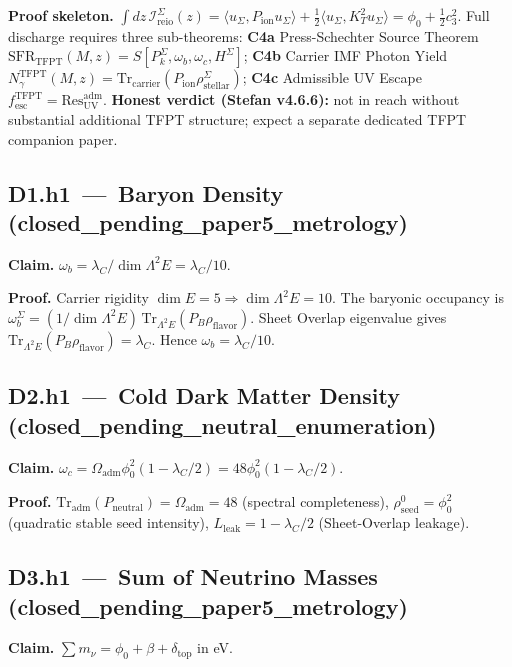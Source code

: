 \documentclass[11pt,a4paper]{article}
\begin{document}
\textbf{Proof skeleton.}
\(\int dz\,\mathcal I_{\mathrm{reio}}^\Sigma(z) =
\langle u_\Sigma,P_{\mathrm{ion}}u_\Sigma\rangle+
\tfrac12\langle u_\Sigma,K_T^2 u_\Sigma\rangle =
\phi_0+\tfrac12 c_3^2\).  Full discharge requires three
sub-theorems:
\textbf{C4a} Press-Schechter Source Theorem
\(\mathrm{SFR}_{\mathrm{TFPT}}(M,z)
=S[P_k^\Sigma,\omega_b,\omega_c,H^\Sigma]\);
\textbf{C4b} Carrier IMF Photon Yield
\(N_\gamma^{\mathrm{TFPT}}(M,z)
=\mathrm{Tr}_{\mathrm{carrier}}(P_{\mathrm{ion}}\rho_{\mathrm{stellar}}^\Sigma)\);
\textbf{C4c} Admissible UV Escape
\(f_{\mathrm{esc}}^{\mathrm{TFPT}}=\mathrm{Res}_{\mathrm{UV}}^{\mathrm{adm}}\).
\textbf{Honest verdict (Stefan v4.6.6):} not in reach without
substantial additional TFPT structure; expect a separate dedicated
TFPT companion paper.

\subsection*{D1.h1 \,---\, Baryon Density
\,(\textsf{closed\_pending\_paper5\_metrology})}
\textbf{Claim.} \(\omega_b=\lambda_C/\dim\Lambda^2 E=\lambda_C/10\).

\textbf{Proof.}
Carrier rigidity \(\dim E=5\Rightarrow\dim\Lambda^2 E=10\).  The
baryonic occupancy is
\(\omega_b^\Sigma=(1/\dim\Lambda^2 E)\,
\mathrm{Tr}_{\Lambda^2 E}(P_B\rho_{\mathrm{flavor}})\).
Sheet Overlap eigenvalue gives
\(\mathrm{Tr}_{\Lambda^2 E}(P_B\rho_{\mathrm{flavor}})=\lambda_C\).
Hence \(\omega_b=\lambda_C/10\).

\subsection*{D2.h1 \,---\, Cold Dark Matter Density
\,(\textsf{closed\_pending\_neutral\_enumeration})}
\textbf{Claim.}
\(\omega_c=\Omega_{\mathrm{adm}}\phi_0^2(1-\lambda_C/2)
=48\phi_0^2(1-\lambda_C/2)\).

\textbf{Proof.}
\(\mathrm{Tr}_{\mathrm{adm}}(P_{\mathrm{neutral}})=\Omega_{\mathrm{adm}}=48\)
(spectral completeness),
\(\rho_{\mathrm{seed}}^0=\phi_0^2\) (quadratic stable seed intensity),
\(L_{\mathrm{leak}}=1-\lambda_C/2\) (Sheet-Overlap leakage).

\subsection*{D3.h1 \,---\, Sum of Neutrino Masses
\,(\textsf{closed\_pending\_paper5\_metrology})}
\textbf{Claim.}
\(\sum m_\nu=\phi_0+\beta+\delta_{\mathrm{top}}\) in eV.
\end{document}
